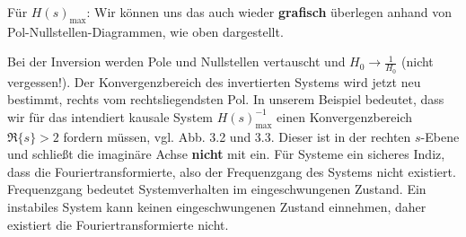 
\begin{ExCalc}
Für $H(s)_\mathrm{max}$: Wir können uns das auch wieder \textbf{grafisch}
überlegen anhand von Pol-Nullstellen-Diagrammen, wie oben dargestellt.

Bei der Inversion werden Pole und Nullstellen vertauscht und $H_0\rightarrow \frac{1}{H_0}$
(nicht vergessen!).
Der Konvergenzbereich des invertierten Systems wird jetzt neu bestimmt, rechts
vom rechtsliegendsten Pol.
In unserem Beispiel bedeutet, dass wir für das intendiert kausale
System $H(s)_\mathrm{max}^{-1}$ einen Konvergenzbereich $\Re\{s\}>2$ fordern
müssen, vgl. Abb. 3.2 und 3.3. Dieser ist in der rechten $s$-Ebene und schließt die imaginäre Achse
\textbf{nicht} mit ein. Für Systeme ein sicheres Indiz, dass die
Fouriertransformierte, also der Frequenzgang des Systems nicht existiert.
Frequenzgang bedeutet Systemverhalten im eingeschwungenen Zustand. Ein instabiles
System kann keinen eingeschwungenen Zustand einnehmen, daher existiert die
Fouriertransformierte nicht.


\end{ExCalc}



